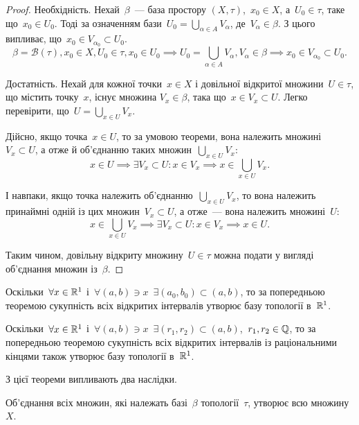 \begin{proof}
Необхідність. Нехай~$\beta$~--- база простору
$(X, \tau)$,~$x_0 \in X$, а~$U_0 \in \tau$, таке що~$x_0 \in U_0$. Тоді за означенням бази~$U_0 = \bigcup_{\alpha \in A} V_\alpha$, де~$V_\alpha \in \beta$. З цього випливає, що~$x_0 \in V_{\alpha_0} \subset U_0$.
\begin{equation*}
\beta = \mathcal{B}(\tau), x_0 \in X, U_0 \in \tau, x_0 \in U_0 \implies U_0 = \bigcup_{\alpha \in A} V_\alpha, V_\alpha \in \beta \implies x_0 \in V_{\alpha_0} \subset U_0.
\end{equation*}

Достатність. Нехай для кожної точки~$x \in X$ і довільної
відкритої множини~$U \in \tau$, що містить точку~$x$, існує множина
$V_x \in \beta$, така що~$x \in V_x \subset U$. Легко перевірити, що~$U = \bigcup_{x \in U} V_x$.

Дійсно, якщо точка~$x \in U$, то за умовою теореми, вона
належить множині~$V_x \subset U$, а отже й об'єднанню таких
множин~$\bigcup_{x \in U} V_x$: \[ x \in U \implies \exists V_x \subset U: x \in V_x \implies x \in \bigcup_{x \in U} V_x. \]

І навпаки, якщо точка належить об'єднанню~$\bigcup_{x \in U} V_x$, то
вона належить принаймні одній із цих множин~$V_x \subset U$, а
отже~--- вона належить множині~$U$: \[ x \in \bigcup_{x \in U} V_x \implies \exists V_x \subset U: x \in V_x \implies x \in U. \]

Таким чином, довільну відкриту множину~$U \in \tau$ можна
подати у вигляді об'єд\-нання множин із~$\beta$.
\end{proof}

\begin{example}
Оскільки~$\forall x \in \mathbb{R}^1$ і~$\forall (a, b) \ni x$~$\exists(a_0, b_0) \subset (a, b)$,
то за попередньою теоремою сукупність всіх відкритих інтервалів
утворює базу топології в~$\mathbb{R}^1$.
\end{example}

\begin{example}
Оскільки~$\forall x \in \mathbb{R}^1$ і~$\forall (a, b) \ni x$~$\exists (r_1, r_2) \subset (a, b)$,~$r_1, r_2 \in \mathbb{Q}$, то за попередньою теоремою сукупність всіх відкритих
інтервалів із раціональними кінцями також утворює базу
топології в~$\mathbb{R}^1$.
\end{example}

З цієї теореми випливають два наслідки.

\begin{corollary}
Об'єднання всіх множин, які належать
базі~$\beta$ топології~$\tau$, утворює всю множину~$X$.
\end{corollary}


